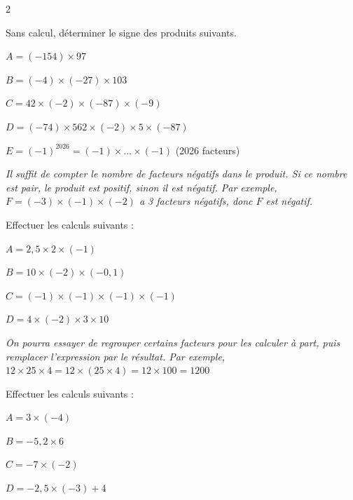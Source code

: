 \begin{multicols}{2}
    \begin{exercice}{}{}
        Sans calcul, déterminer le signe des produits suivants.
        \begin{enumeratebf}
            \item $A=(-154)\times 97$
            \item $B=(-4)\times (-27)\times 103$
            \item $C=42\times (-2)\times (-87)\times (-9)$
            \item $D=(-74)\times 562\times (-2)\times 5\times (-87)$
            \item $E= (-1)^{2026} = (-1)\times \dots \times (-1)$ (2026 facteurs)
        \end{enumeratebf}
        \textit{Il suffit de compter le nombre de facteurs négatifs dans le produit. Si ce nombre est pair, le produit est positif, sinon il est négatif. Par exemple, $F = (-3) \times (-1) \times (-2)$ a 3 facteurs négatifs, donc $F$ est négatif.}
    \end{exercice}

    \begin{exercice}{}{}
        Effectuer les calculs suivants :
        \begin{enumeratebf}
            \item $A = 2,5 \times 2 \times (-1)$
            \item $B = 10 \times (-2) \times (-0,1)$
            \item $C = (-1) \times (-1) \times (-1) \times (-1)$
            \item $D = 4 \times (-2) \times 3 \times 10$
        \end{enumeratebf}
        \textit{On pourra essayer de regrouper certains facteurs pour les calculer à part, puis remplacer l'expression par le résultat. Par exemple, $12 \times 25 \times 4 = 12 \times (25 \times 4) = 12\times 100 = 1200  $}
    \end{exercice}

    \begin{exercice}{}{}
        Effectuer les calculs suivants :
        \begin{enumeratebf}
            \item $A = 3 \times (-4)$
            \item $B = -5,2 \times 6$
            \item $C = -7 \times (-2)$
            \item $D = -2,5 \times (-3) + 4$
        \end{enumeratebf}
    \end{exercice}


\end{multicols}
